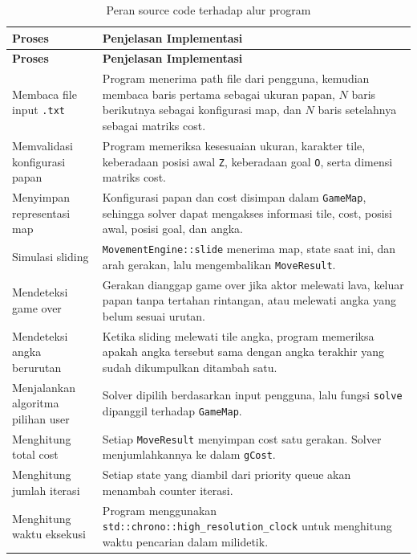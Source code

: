 \begin{longtable}{|p{4.5cm}|p{9.5cm}|}
	\caption{Peran source code terhadap alur program} \\
	\hline
	\rowcolor{blue!15}
	\textbf{Proses} & \textbf{Penjelasan Implementasi} \\
	\hline
	\endfirsthead
	
	\hline
	\rowcolor{blue!15}
	\textbf{Proses} & \textbf{Penjelasan Implementasi} \\
	\hline
	\endhead
	
	Membaca file input \texttt{.txt} & Program menerima path file dari pengguna, kemudian membaca baris pertama sebagai ukuran papan, $N$ baris berikutnya sebagai konfigurasi map, dan $N$ baris setelahnya sebagai matriks cost. \\
	\hline
	Memvalidasi konfigurasi papan & Program memeriksa kesesuaian ukuran, karakter tile, keberadaan posisi awal \texttt{Z}, keberadaan goal \texttt{O}, serta dimensi matriks cost. \\
	\hline
	Menyimpan representasi map & Konfigurasi papan dan cost disimpan dalam \texttt{GameMap}, sehingga solver dapat mengakses informasi tile, cost, posisi awal, posisi goal, dan angka. \\
	\hline
	Simulasi sliding & \texttt{MovementEngine::slide} menerima map, state saat ini, dan arah gerakan, lalu mengembalikan \texttt{MoveResult}. \\
	\hline
	Mendeteksi game over & Gerakan dianggap game over jika aktor melewati lava, keluar papan tanpa tertahan rintangan, atau melewati angka yang belum sesuai urutan. \\
	\hline
	Mendeteksi angka berurutan & Ketika sliding melewati tile angka, program memeriksa apakah angka tersebut sama dengan angka terakhir yang sudah dikumpulkan ditambah satu. \\
	\hline
	Menjalankan algoritma pilihan user & Solver dipilih berdasarkan input pengguna, lalu fungsi \texttt{solve} dipanggil terhadap \texttt{GameMap}. \\
	\hline
	Menghitung total cost & Setiap \texttt{MoveResult} menyimpan cost satu gerakan. Solver menjumlahkannya ke dalam \texttt{gCost}. \\
	\hline
	Menghitung jumlah iterasi & Setiap state yang diambil dari priority queue akan menambah counter iterasi. \\
	\hline
	Menghitung waktu eksekusi & Program menggunakan \texttt{std::chrono::high\_resolution\_clock} untuk menghitung waktu pencarian dalam milidetik. \\

\end{longtable}
